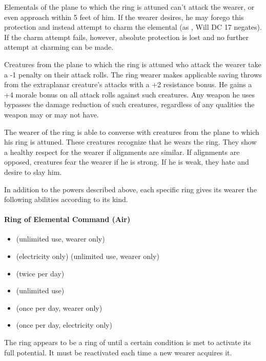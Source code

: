 Elementals of the plane to which the ring is attuned can't attack the wearer, or even approach within 5 feet of him. If the wearer desires, he may forego this protection and instead attempt to charm the elemental (as , Will DC 17 negates). If the charm attempt fails, however, absolute protection is lost and no further attempt at charming can be made.

Creatures from the plane to which the ring is attuned who attack the wearer take a -1 penalty on their attack rolls. 
The ring wearer makes applicable saving throws from the extraplanar creature's attacks with a +2 resistance bonus. 
He gains a +4 morale bonus on all attack rolls against such creatures. 
Any weapon he uses bypasses the damage reduction of such creatures, regardless of any qualities the weapon may or may not have.

The wearer of the ring is able to converse with creatures from the plane to which his ring is attuned. 
These creatures recognize that he wears the ring. 
They show a healthy respect for the wearer if alignments are similar. 
If alignments are opposed, creatures fear the wearer if he is strong. If he is weak, they hate and desire to slay him.

In addition to the powers described above, each specific ring gives its wearer the following abilities according to its kind.

\paragraph{Ring of Elemental Command (Air)}
\begin{itemize}
\item {} (unlimited use, wearer only)
\item {} (electricity only) (unlimited use, wearer only)
\item {} (twice per day)
\item {} (unlimited use)
\item {} (once per day, wearer only)
\item {} (once per day, electricity only)
\end{itemize}
The ring appears to be a ring of  until a certain condition is met to activate its full potential. It must be reactivated each time a new wearer acquires it.


